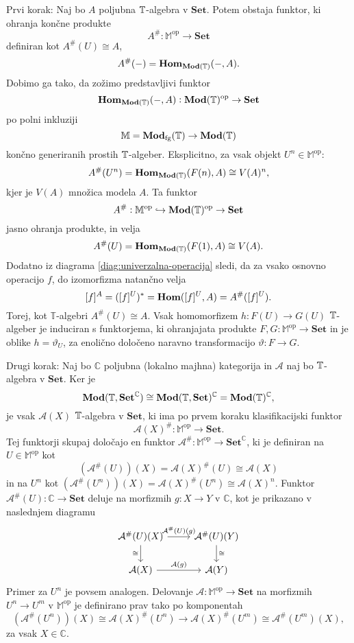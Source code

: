 \documentclass[../kategoricna_logika.tex]{subfiles}
\begin{document}
\begin{dokaz}
  Prvi korak: Naj bo $A$ poljubna $\mathbb{T}$-algebra v $\mathbf{Set}$. Potem obstaja funktor,
  ki ohranja končne produkte
  \[ A^{\#}: \mathbb{M}^{\mathrm{op}} \to \mathbf{Set}\]
  definiran kot $A^{\#}(U) \cong A$,
  \[ A^{\#}(-) = \mathbf{Hom}_{\mathbf{Mod}(\mathbb{T})}(-,A).\]
  Dobimo ga tako, da zožimo predstavljivi funktor
  \[ \mathbf{Hom}_{\mathbf{Mod}(\mathbb{T})}(-,A) : \mathbf{Mod}(\mathbb{T})^{\mathrm{op}} \to \mathbf{Set}\]
  po polni inkluziji
  \[ \mathbb{M} = \mathbf{Mod}_{\mathrm{fg}}(\mathbb{T}) \to \mathbf{Mod}(\mathbb{T})\]
  končno generiranih prostih $\mathbb{T}$-algeber. Eksplicitno, za vsak objekt
  $U^n \in \mathbb{M}^{\mathrm{op}}$:
  \[ A^{\#}(U^n) = \mathbf{Hom}_{\mathbf{Mod}(\mathbb{T})}(F(n), A) \cong V(A)^{n}, \]
  kjer je $V(A)$ množica modela $A$. Ta funktor
  \[ A^{\#} : \mathbb{M}^{\mathrm{op}} \hookrightarrow \mathbf{Mod}(\mathbb{T})^{\mathrm{op}} \to \mathbf{Set}\]
  jasno ohranja produkte, in velja
  \[ A^{\#}(U) = \mathbf{Hom}_{\mathbf{Mod}(\mathbb{T})}(F(1), A) \cong V(A).\]
  Dodatno iz diagrama \eqref{diag:univerzalna-operacija} sledi, da za vsako osnovno operacijo $f$,
  do izomorfizma natančno velja
  \[ [f]^A = ([f]^U)^{*} = \mathbf{Hom}([f]^U,A) = A^{\#}([f]^U).\]
  Torej, kot $\mathbb{T}$-algebri $A^{\#}(U) \cong A$.
  Vsak homomorfizem $h : F(U) \to G(U)$ $\mathbb{T}$-algeber
  je induciran s funktorjema, ki ohranjajata produkte
  ${F,G : \mathbb{M}^{\mathrm{op}} \to \mathbf{Set}}$
  in je oblike $h = \vartheta_U$, za enolično določeno naravno transformacijo $\vartheta : F \to G$.

  Drugi korak: Naj bo $\mathbb{C}$ poljubna (lokalno majhna) kategorija in $\mathcal{A}$ naj bo
  $\mathbb{T}$-algebra v $\mathbf{Set}$. Ker je
  \[ \mathbf{Mod}(\mathbb{T}, \mathbf{Set}^{\mathbb{C}}) \cong
    \mathbf{Mod}(\mathbb{T}, \mathbf{Set})^{\mathbb{C}} = \mathbf{Mod}(\mathbb{T})^{\mathbb{C}},\]
  je vsak $\mathcal{A}(X)$ $\mathbb{T}$-algebra v $\mathbf{Set}$,
  ki ima po prvem koraku klasifikacijski funktor
  \[ \mathcal{A}(X)^{\#} : \mathbb{M}^{\mathrm{op}} \to \mathbf{Set}.\]
  Tej funktorji skupaj določajo en funktor
  $\mathcal{A}^{\#} : \mathbb{M}^{\mathrm{op}} \to \mathbf{Set}^{\mathbb{C}}$,
  ki je definiran na $U \in \mathbb{M}^{\mathrm{op}}$ kot
  \[ (\mathcal{A}^{\#}(U))(X) = \mathcal{A}(X)^{\#}(U) \cong \mathcal{A}(X)\]
  in na $U^n$ kot $(\mathcal{A}^{\#}(U^{n}))(X) = \mathcal{A}(X)^{\#}(U^n) \cong \mathcal{A}(X)^n$.
  Funktor ${\mathcal{A}^{\#}(U) : \mathbb{C} \to \mathbf{Set}}$ deluje na morfizmih $g : X \to Y$ v
  $\mathbb{C}$, kot je prikazano v naslednjem diagramu
  \begin{equation*}
    \begin{tikzcd}
      \mathcal{A}^{\#}(U)(X) \ar[d, "\cong"'] \ar[r, "{\mathcal{A}^{\#}(U)(g)}"] &
      \mathcal{A}^{\#}(U)(Y) \ar[d, "\cong"] \\
      \mathcal{A}(X) \ar[r, "{\mathcal{A}(g)}"] & \mathcal{A}(Y)
    \end{tikzcd}
  \end{equation*}
  Primer za $U^n$ je povsem analogen. Delovanje
  $\mathcal{A} : \mathbb{M}^{\mathrm{op}} \to \mathbf{Set}$ na morfizmih $U^n \to U^m$
  v $\mathbb{M}^{\mathrm{op}}$ je definirano prav tako po komponentah
  \[ (\mathcal{A}^{\#}(U^n))(X) \cong \mathcal{A}(X)^{\#}(U^n) \to
    \mathcal{A}(X)^{\#}(U^m) \cong \mathcal{A}^{\#}(U^m)(X),\]
  za vsak $X \in \mathbb{C}$.


\end{dokaz}
\end{document}
